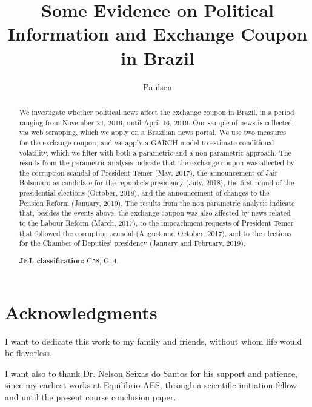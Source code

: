 \documentclass[cic,tc, english]{iiufrgs}
\title{Some Evidence on Political Information and Exchange Coupon in Brazil}
\author{Paulsen}{Bernardo Hillesheim}
\begin{document}



\chapter*{Acknowledgments}

I want to dedicate this work to my family and friends, without whom life would be flavorless. 

I want also to thank Dr. Nelson Seixas do Santos for his support and patience, since my earliest works at Equilíbrio AES, through a scientific initiation fellow and until the present course conclusion paper.



\begin{abstract}
    We investigate whether political news affect the exchange coupon in Brazil, in a period ranging from November 24, 2016, until April 16, 2019. Our sample of news is collected via web scrapping, which we apply on a Brazilian news portal. We use two measures for the exchange coupon, and we apply a GARCH model to estimate conditional volatility, which we filter with both a parametric and a non parametric approach. The results from the parametric analysis indicate that the exchange coupon was affected by the corruption scandal of President Temer (May, 2017), the announcement of Jair Bolsonaro as candidate for the republic's presidency (July, 2018), the first round of the presidential elections (October, 2018), and the announcement of changes to the Pension Reform (January, 2019). The results from the non parametric analysis indicate that, besides the events above, the exchange coupon was also affected by news related to the Labour Reform (March, 2017), to the impeachment requests of President Temer that followed the corruption scandal (August and October, 2017), and to the elections for the Chamber of Deputies' presidency (January and February, 2019).
    
    \noindent
    \textbf{JEL classification:} C58, G14.
    
\end{abstract}

\listoffigures
\end{document}
